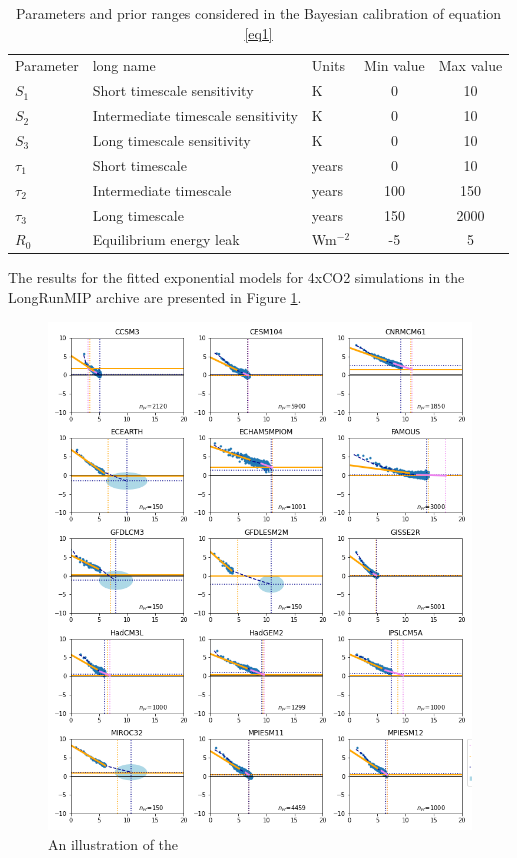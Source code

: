 \documentclass[esd, article]{copernicus}
\begin{document}
\begin{table}[]
    \centering
    \begin{tabular}{l|l|l|c|c}
    Parameter & long name & Units & Min value & Max value \\
    $S_1$ & Short timescale sensitivity & K & 0 & 10 \\
    $S_2$ & Intermediate timescale sensitivity & K & 0 & 10 \\
    $S_3$ & Long timescale sensitivity & K & 0 & 10 \\
    $\tau_1$ & Short timescale & years & 0 & 10 \\
    $\tau_2$ & Intermediate timescale & years & 100 & 150 \\
    $\tau_3$ & Long timescale & years & 150 & 2000 \\
    $R_0$ & Equilibrium energy leak & Wm$^{-2}$ & -5 & 5 \\
    \end{tabular}
    \caption{Parameters and prior ranges considered in the Bayesian calibration of equation \ref{eq1}}
    \label{tab:my_label}
\end{table}

The results for the fitted exponential models for 4xCO2 simulations in the LongRunMIP archive are presented in Figure \ref{fig:greg_lrmip}.  

\begin{figure}
    \centering
    \includegraphics[width=\linewidth]{greg_lrmip.png}
    \caption{An illustration of the }
    \label{fig:greg_lrmip}
\end{figure}
\end{document}
